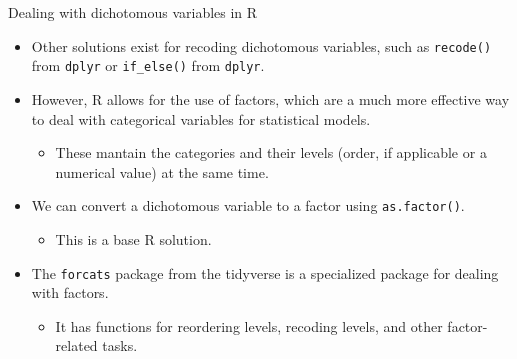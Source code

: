 \documentclass[
  10pt,
  ignorenonframetext,
]{beamer}
\providecommand{\tightlist}{%
  \setlength{\itemsep}{0pt}\setlength{\parskip}{0pt}}\usepackage{longtable,booktabs,array}
\begin{document}
\begin{frame}[fragile]{Dealing with dichotomous variables in R}
\label{dealing-with-dichotomous-variables-in-r-1}
\begin{itemize}
\item
  Other solutions exist for recoding dichotomous variables, such as
  \texttt{recode()} from \texttt{dplyr} or \texttt{if\_else()} from
  \texttt{dplyr}.
\item
  However, R allows for the use of factors, which are a much more
  effective way to deal with categorical variables for statistical
  models.

  \begin{itemize}
  \tightlist
  \item
    These mantain the categories and their levels (order, if applicable
    or a numerical value) at the same time.
  \end{itemize}
\item
  We can convert a dichotomous variable to a factor using
  \texttt{as.factor()}.

  \begin{itemize}
  \tightlist
  \item
    This is a base R solution.
  \end{itemize}
\item
  The \texttt{forcats} package from the tidyverse is a specialized
  package for dealing with factors.

  \begin{itemize}
  \tightlist
  \item
    It has functions for reordering levels, recoding levels, and other
    factor-related tasks.
  \end{itemize}
\end{itemize}
\end{frame}
\end{document}
